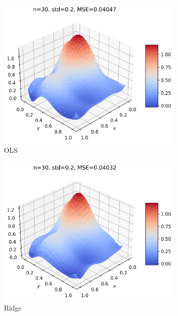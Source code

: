 \documentclass[11pt]{article}
\begin{document}
\begin{figure}[H]
    \begin{subfigure}{.5\textwidth}
        \centering
        \includegraphics[width=.92\textwidth]{../figures/test_OLS.png}
        \caption{OLS}
        \label{fig:}
    \end{subfigure}
    \begin{subfigure}{.5\textwidth}
        \centering
        \includegraphics[width=.92\textwidth]{../figures/test_RIDGE.png}
        \caption{Ridge}
        \label{fig:}
    \end{subfigure}
    \begin{subfigure}{.5\textwidth}
        \centering

\end{subfigure}
\end{figure}
\end{document}
